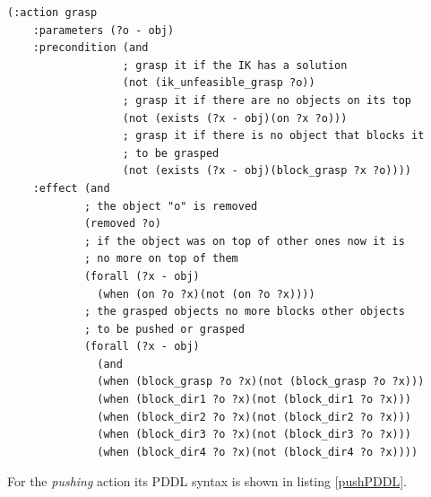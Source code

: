 \lstset{language=pddl}
\begin{lstlisting}[caption={PDDL syntax of the grasping action},label=graspPDDL]
(:action grasp
    :parameters (?o - obj)
    :precondition (and
                  ; grasp it if the IK has a solution
                  (not (ik_unfeasible_grasp ?o))    
                  ; grasp it if there are no objects on its top
                  (not (exists (?x - obj)(on ?x ?o)))
                  ; grasp it if there is no object that blocks it
                  ; to be grasped
                  (not (exists (?x - obj)(block_grasp ?x ?o))))
    :effect (and
            ; the object "o" is removed
            (removed ?o)
            ; if the object was on top of other ones now it is
            ; no more on top of them
            (forall (?x - obj)
              (when (on ?o ?x)(not (on ?o ?x))))
            ; the grasped objects no more blocks other objects 
            ; to be pushed or grasped
            (forall (?x - obj)
              (and
              (when (block_grasp ?o ?x)(not (block_grasp ?o ?x)))
              (when (block_dir1 ?o ?x)(not (block_dir1 ?o ?x)))
              (when (block_dir2 ?o ?x)(not (block_dir2 ?o ?x)))
              (when (block_dir3 ?o ?x)(not (block_dir3 ?o ?x)))
              (when (block_dir4 ?o ?x)(not (block_dir4 ?o ?x))))
\end{lstlisting}

For the \textit{pushing} action its PDDL syntax is shown in listing \ref{pushPDDL}.

